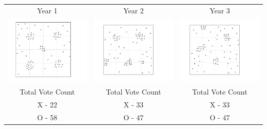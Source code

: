 \begin{tabular}{c c c }

Year 1 & Year 2 & Year 3 \\
 \includegraphics[width=2in]{assets/Gerrymandering/Gerry4x4-80-1.pdf} &  \includegraphics[width=2in]{assets/Gerrymandering/Gerry4x4-80-2.pdf} &  \includegraphics[width=2in]{assets/Gerrymandering/Gerry4x4-80-3.pdf}\\
 Total Vote Count &  Total Vote Count &  Total Vote Count\\
 X -  22& X - 33 & X  - 33\\
 O - 58 & O - 47 & O - 47
 \end{tabular}
